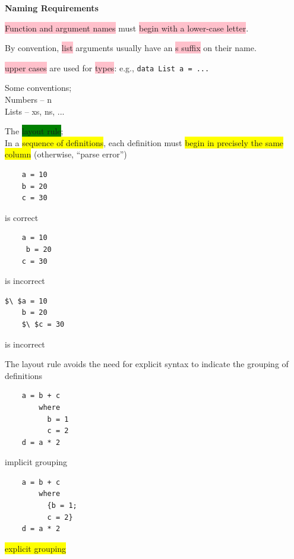 \documentclass[tikz,border=10pt]{project_plan}
\begin{document}
\textbf{Naming Requirements}

\colorbox{pink}{Function and argument names} must \colorbox{pink}{begin with a lower-case letter}.

By convention, \colorbox{pink}{list} arguments usually have an \colorbox{pink}{s suffix} on
their name.

\colorbox{pink}{upper cases} are used for \colorbox{pink}{types}: e.g.,
\lstinline|data List a = ...|

Some conventions;\\
Numbers – n\\
Lists – xs, ns, ...

The \colorbox{green}{layout rule};\\
In a \colorbox{yellow}{sequence of definitions}, each definition must \colorbox{yellow}{begin in
  precisely the same column} (otherwise, “parse error”)

\begin{minipage}[]{.3\linewidth}
  \begin{lstlisting}
    a = 10
    b = 20
    c = 30
  \end{lstlisting}
  is correct
\end{minipage}
\hfill
\begin{minipage}[]{.3\linewidth}
  \begin{lstlisting}
    a = 10
     b = 20
    c = 30
  \end{lstlisting}
  is incorrect
\end{minipage}
\hfill
\begin{minipage}[]{.3\linewidth}
  \begin{lstlisting}[mathescape]
    $\ $a = 10
    b = 20
    $\ $c = 30
  \end{lstlisting}
  is incorrect
\end{minipage}

The layout rule avoids the need for explicit syntax to
indicate the grouping of definitions

\begin{minipage}[]{.5\linewidth}
  \begin{lstlisting}
    a = b + c
        where
          b = 1
          c = 2
    d = a * 2
  \end{lstlisting}
  implicit grouping
\end{minipage}
\hfill
\begin{minipage}[]{.5\linewidth}
  \begin{lstlisting}
    a = b + c
        where
          {b = 1;
          c = 2}
    d = a * 2
  \end{lstlisting}
  \colorbox{yellow}{explicit grouping}
\end{minipage}
\end{document}
